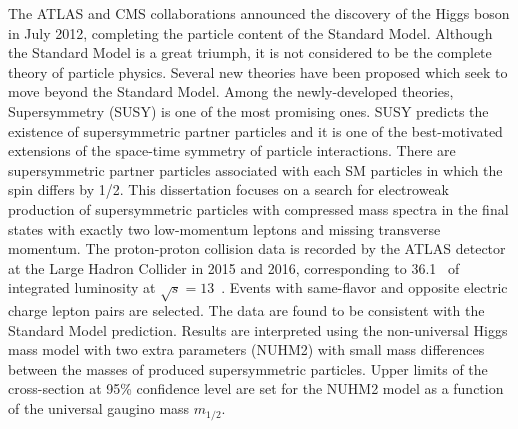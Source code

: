 The ATLAS and CMS collaborations announced the discovery of the Higgs boson in July 2012, completing the particle content of the Standard Model.
Although the Standard Model is a great triumph, it is not considered to be the complete theory of particle physics.
Several new theories have been proposed which seek to move beyond the Standard Model.
Among the newly-developed theories, Supersymmetry (SUSY) is one of the most promising ones.
SUSY predicts the existence of supersymmetric partner particles and it is one of the best-motivated extensions of the space-time symmetry of particle interactions.
There are supersymmetric partner particles associated with each SM particles in which the spin differs by 1/2.
This dissertation focuses on a search for electroweak production of supersymmetric particles with compressed mass spectra in the final states with exactly two low-momentum leptons and missing transverse momentum.
The proton-proton collision data is recorded by the ATLAS detector at the Large Hadron Collider in 2015 and 2016, corresponding to 36.1~{\ifb} of integrated luminosity at $\sqrt{s} = 13$~{\TeV}.
Events with same-flavor and opposite electric charge lepton pairs are selected.
The data are found to be consistent with the Standard Model prediction.
Results are interpreted using the non-universal Higgs mass model with two extra parameters (NUHM2) with small mass differences between the masses of produced supersymmetric particles.
Upper limits of the cross-section at 95\% confidence level are set for the NUHM2 model as a function of the universal gaugino mass $m_{1/2}$.
